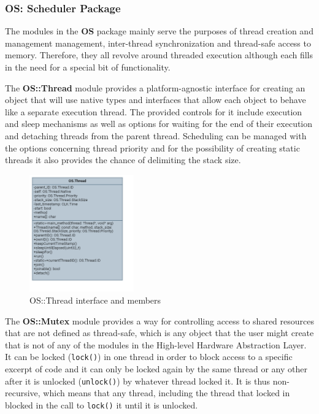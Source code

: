 \subsubsection{OS: Scheduler Package}
\label{sec:osPack}
The modules in the \textbf{OS} package mainly serve the purposes of thread creation and management management, inter-thread synchronization and thread-safe access to memory. Therefore, they all revolve around threaded execution although each fills in the need for a special bit of functionality.

The \textbf{OS::Thread} module provides a platform-agnostic interface for creating an object that will use native types and interfaces that allow each object to behave like a separate execution thread. The provided controls for it include execution and sleep mechanisms as well as options for waiting for the end of their execution and detaching threads from the parent thread. Scheduling can be managed with the options concerning thread priority and for the possibility of creating static threads it also provides the chance of delimiting the stack size. 

\begin{figure}[H]
	\centering
	\includegraphics[width=0.4\textwidth]{./img/navig-class-thread.png}
	\caption {OS::Thread interface and members}
	\label{fig:navig-class-thread}
	\end{figure}


The \textbf{OS::Mutex} module provides a way for controlling access to shared resources that are not defined as thread-safe, which is any object that the user might create that is not of any of the modules in the High-level Hardware Abstraction Layer. It can be locked (\texttt{lock()}) in one thread in order to block access to a specific excerpt of code and it can only be locked again by the same thread or any other after it is unlocked (\texttt{unlock()}) by whatever thread locked it. It is thus non-recursive, which means that any thread, including the thread that locked in blocked in the call to \texttt{lock()} it until it is unlocked.

